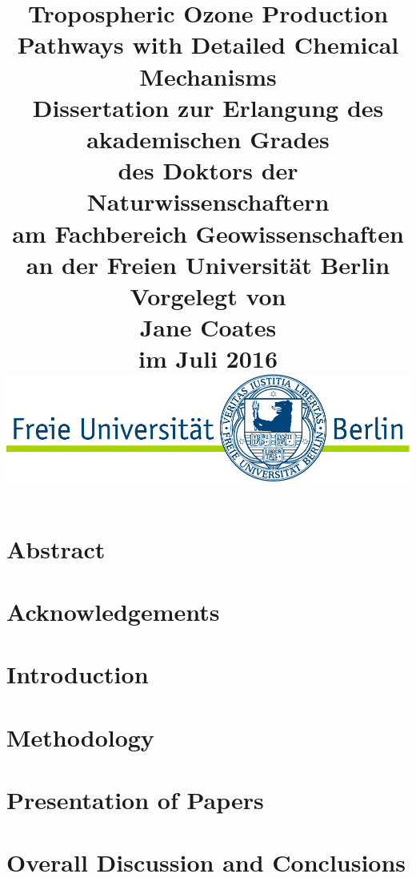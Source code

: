\documentclass[12pt,twoside,openright,a4paper]{report}
\title{
    \textbf{{\Huge{Tropospheric Ozone Production \\Pathways with Detailed Chemical Mechanisms}}}\\ \vspace{2cm}
    \normalsize{{Dissertation zur Erlangung des akademischen Grades} \\
    {des Doktors der Naturwissenschaftern} \\
    {am Fachbereich Geowissenschaften} \\
    {an der Freien Universit\"{a}t Berlin}\\} \vspace{2cm}
    \textbf{{Vorgelegt von} \\
    {Jane Coates} \\
    {im Juli 2016} \\} \vspace{3cm}
    {\includegraphics[scale=0.5]{img/FU_logo}}
}
\author{\vspace{-5ex}}
\date{\vspace{-5ex}}
\begin{document}
\maketitle
\clearpage{\pagestyle{empty}\cleardoublepage}


\clearpage{\pagestyle{empty}\cleardoublepage}


\chapter*{Abstract}
\clearpage{\pagestyle{empty}\cleardoublepage}
\chapter*{Acknowledgements}
\clearpage{\pagestyle{empty}\cleardoublepage}

\tableofcontents{\fancyhead[LE]{\contentsname}\fancyhead[RE]{}}
\clearpage{\pagestyle{empty}\cleardoublepage}
\listoftables{\fancyhead[LE]{\contentsname}\fancyhead[RE]{}}
\clearpage{\pagestyle{empty}\cleardoublepage}
\listoffigures{\fancyhead[LE]{\contentsname}\fancyhead[RE]{}}
\clearpage{\pagestyle{empty}\cleardoublepage}

\fancyhf{}
\fancyfoot{}
\fancyfoot[LE,RO]{\thepage}
\renewcommand{\headrulewidth}{2pt}
\renewcommand{\footrulewidth}{1pt}
\chapter{Introduction} \label{s:introduction}

\clearpage{\pagestyle{empty}\cleardoublepage}

\chapter{Methodology} \label{s:methodology}
\clearpage{\pagestyle{empty}\cleardoublepage}

\chapter{Presentation of Papers} \label{s:papers}

\clearpage{\pagestyle{empty}\cleardoublepage}

\chapter{Overall Discussion and Conclusions} \label{s:conclusions}
\clearpage{\pagestyle{empty}\cleardoublepage}
\end{document}
